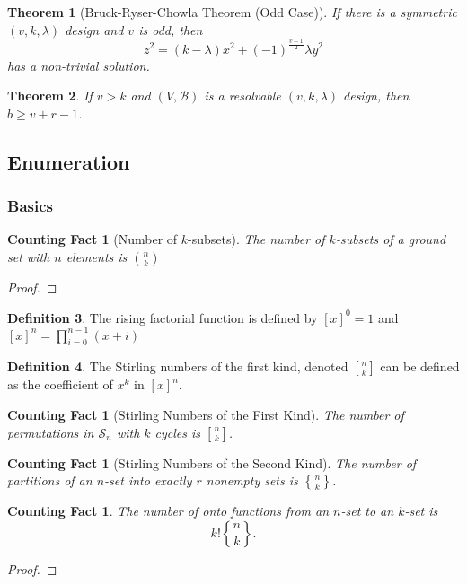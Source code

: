 \documentclass[12]{article}
\newcounter{countingFactCounter}
\newtheorem{thm}{Theorem}[section] %
\newtheorem{countingFact}[countingFactCounter]{Counting Fact}
\theoremstyle{definition}
\newtheorem{defn}[thm]{Definition} %
\begin{document}
	\begin{thm}[Bruck-Ryser-Chowla Theorem (Odd Case)]
		If there is a symmetric $(v,k,\lambda)$ design and $v$ is odd, then
		$$z^2 = (k-\lambda)x^2 + (-1)^{\tfrac{v-1}{2}}\lambda y^2$$
		has a non-trivial solution.
	\end{thm}
	
	\begin{thm}
		If $v > k$ and $(V, \mathcal{B})$ is a resolvable $(v, k, \lambda)$ design, then $b \geq v + r-1$.
	\end{thm}
	
	\subsection{Enumeration}
	
	\subsubsection{Basics}
	
	\begin{countingFact}[Number of $k$-subsets]
		The number of $k$-subsets of a ground set with $n$ elements is ${n \choose k}$
	\end{countingFact}
	\begin{proof}
	
	\end{proof}

	\begin{defn}
		The rising factorial function is defined by $[x]^0 = 1$ and $[x]^n = \prod_{i=0}^{n-1} (x+i)$
	\end{defn}

	\begin{defn}
		The Stirling numbers of the first kind, denoted ${n \brack k}$ can be defined as the coefficient of $x^k$ in $[x]^n$.
	\end{defn}
	
	\begin{countingFact}[Stirling Numbers of the First Kind]
		The number of permutations in $\mathcal{S}_n$ with $k$ cycles is ${n \brack k}$.
	\end{countingFact}

	\begin{countingFact}[Stirling Numbers of the Second Kind]
		The number of partitions of an $n$-set into exactly $r$ nonempty sets is ${n \brace k}$.
	\end{countingFact}

	\begin{countingFact}
		The number of onto functions from an $n$-set to an $k$-set is 
		$$k!{n \brace k}.$$
	\end{countingFact}
	\begin{proof}
		
	\end{proof}
\end{document}
